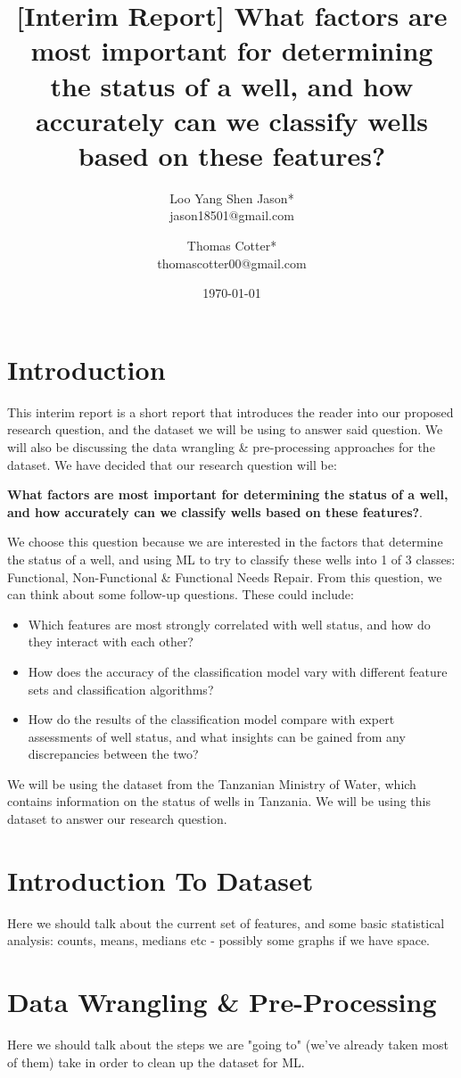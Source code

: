 \documentclass{article}
\title{[Interim Report] What factors are most important for determining the status of a well, and how accurately can we classify wells based on these features? }
\author{Loo Yang Shen Jason*\\
        jason18501@gmail.com \and Thomas Cotter*\\
        thomascotter00@gmail.com}
\date{\today}
\begin{document}
    
\maketitle

\section{Introduction}
\label{sec:intro}
This interim report is a short report that introduces the reader into our proposed research question, and the dataset we will be using to answer said question. We will also be discussing the data wrangling \& pre-processing approaches for the dataset. We have decided that our research question will be: 

\textbf{What factors are most important for determining the status of a well, and how accurately can we classify wells based on these features?}. 

We choose this question because we are interested in the factors that determine the status of a well, and using ML to try to classify these wells into 1 of 3 classes: Functional, Non-Functional \& Functional Needs Repair. From this question, we can think about some follow-up questions. These could include:
    \begin{itemize}
        \item Which features are most strongly correlated with well status, and how do they interact with each other?
        \item How does the accuracy of the classification model vary with different feature sets and classification algorithms?
        \item How do the results of the classification model compare with expert assessments of well status, and what insights can be gained from any discrepancies between the two?
    \end{itemize}


We will be using the dataset from the Tanzanian Ministry of Water, which contains information on the status of wells in Tanzania. We will be using this dataset to answer our research question.

\section{Introduction To Dataset}

Here we should talk about the current set of features, and some basic statistical analysis: counts, means, medians etc - possibly some graphs if we have space.

\section{Data Wrangling \& Pre-Processing}

Here we should talk about the steps we are "going to" (we've already taken most of them) take in order to clean up the dataset for ML.
\end{document}
